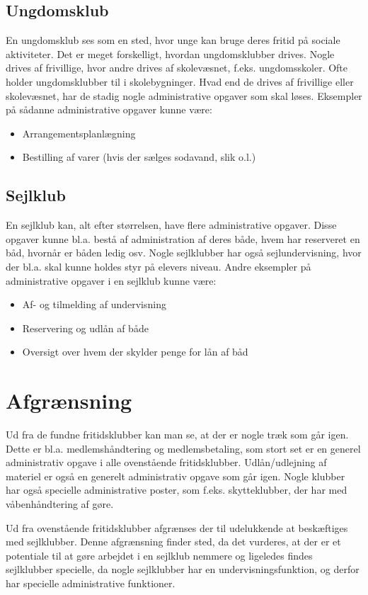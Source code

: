 \subsection{Ungdomsklub}

En ungdomsklub ses som en sted, hvor unge kan bruge deres fritid på sociale aktiviteter. Det er meget
forskelligt, hvordan ungdomsklubber drives. Nogle drives af frivillige, hvor andre drives af skolevæsnet\citep{ung1},
f.eks. ungdomsskoler. Ofte holder ungdomsklubber til i skolebygninger. Hvad end de drives af frivillige eller
skolevæsnet, har de stadig nogle administrative opgaver som skal løses. Eksempler på sådanne administrative
opgaver kunne være:

\begin{itemize}
  \item Arrangementsplanlægning
  \item Bestilling af varer (hvis der sælges sodavand, slik o.l.)
\end{itemize}

\subsection{Sejlklub}

En sejlklub kan, alt efter størrelsen, have flere administrative opgaver. Disse opgaver kunne bl.a. bestå af
administration af deres både, hvem har reserveret en båd, hvornår er båden ledig osv. Nogle sejlklubber har
også sejlundervisning, hvor der bl.a. skal kunne holdes styr på elevers niveau. Andre eksempler på
administrative opgaver i en sejlklub kunne være:

\begin{itemize}
  \item Af- og tilmelding af undervisning
  \item Reservering og udlån af både
  \item Oversigt over hvem der skylder penge for lån af båd
\end{itemize}

\section{Afgrænsning}

Ud fra de fundne fritidsklubber kan man se, at der er nogle træk som går igen. Dette er bl.a. medlemshåndtering og
medlemsbetaling, som stort set er en generel administrativ opgave i alle ovenstående fritidsklubber. Udlån/udlejning af materiel er også en generelt administrativ opgave som går igen.
Nogle klubber har
også specielle administrative poster, som f.eks. skytteklubber, der har med våbenhåndtering af gøre.

Ud fra ovenstående fritidsklubber afgrænses der til udelukkende at beskæftiges med sejlklubber. Denne afgrænsning finder
sted, da det vurderes, at der er et potentiale til at gøre arbejdet i en sejlklub nemmere og ligeledes findes
sejlklubber specielle, da nogle sejlklubber har en undervisningsfunktion, og derfor har specielle administrative
funktioner.
